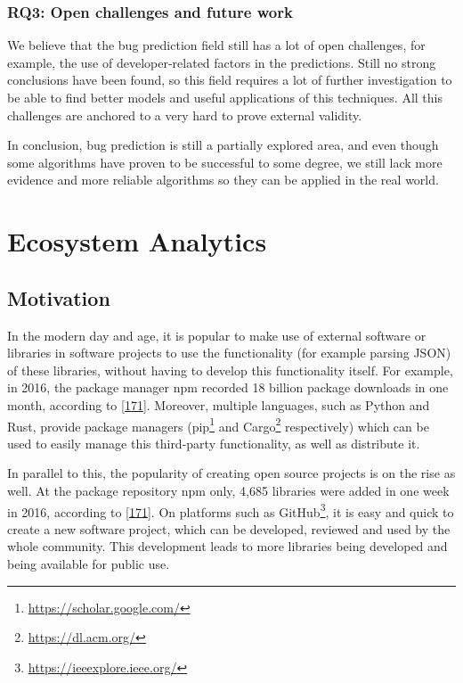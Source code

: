 \documentclass[]{book}
\let\rmarkdownfootnote\footnote%
\def\footnote{\protect\rmarkdownfootnote}
\begin{document}
\subsection{RQ3: Open challenges and future
work}\label{rq3-open-challenges-and-future-work}

We believe that the bug prediction field still has a lot of open
challenges, for example, the use of developer-related factors in the
predictions. Still no strong conclusions have been found, so this field
requires a lot of further investigation to be able to find better models
and useful applications of this techniques. All this challenges are
anchored to a very hard to prove external validity.

In conclusion, bug prediction is still a partially explored area, and
even though some algorithms have proven to be successful to some degree,
we still lack more evidence and more reliable algorithms so they can be
applied in the real world.

\chapter{Ecosystem Analytics}\label{ecosystem-analytics}

\section{Motivation}\label{motivation-3}

In the modern day and age, it is popular to make use of external
software or libraries in software projects to use the functionality (for
example parsing JSON) of these libraries, without having to develop this
functionality itself. For example, in 2016, the package manager npm
recorded 18 billion package downloads in one month, according to
{[}\protect\hyperlink{ref-Linux2016}{171}{]}. Moreover, multiple
languages, such as Python and Rust, provide package managers
(pip\footnote{\url{https://scholar.google.com/}} and Cargo\footnote{\url{https://dl.acm.org/}}
respectively) which can be used to easily manage this third-party
functionality, as well as distribute it.

In parallel to this, the popularity of creating open source projects is
on the rise as well. At the package repository npm only, 4,685 libraries
were added in one week in 2016, according to
{[}\protect\hyperlink{ref-Linux2016}{171}{]}. On platforms such as
GitHub\footnote{\url{https://ieeexplore.ieee.org/}}, it is easy and
quick to create a new software project, which can be developed, reviewed
and used by the whole community. This development leads to more
libraries being developed and being available for public use.
\end{document}
